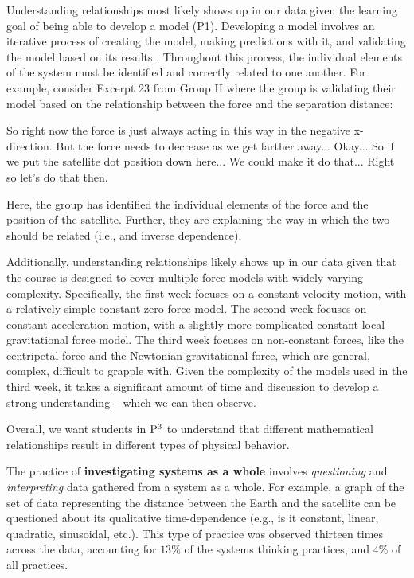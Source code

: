 \documentclass{msuphddissertation}
\begin{document}
\begin{doublespace}
Understanding relationships most likely shows up in our data given the learning goal of being able to develop a model (P1).  Developing a model involves an iterative process of creating the model, making predictions with it, and validating the model based on its results \cite{AAPT2016}.  Throughout this process, the individual elements of the system must be identified and correctly related to one another.  For example, consider Excerpt 23 from Group H where the group is validating their model based on the relationship between the force and the separation distance: \begin{description}
\SC So right now the force is just always acting in this way {in the negative x-direction}.
\SC But the force needs to decrease as we get farther away...
\SB Okay...
\SC So if we put the satellite dot position down here...
\SC We could make it do that...
\SA Right so let's do that then.
\end{description}  Here, the group has identified the individual elements of the force and the position of the satellite.  Further, they are explaining the way in which the two should be related (i.e., and inverse dependence).

Additionally, understanding relationships likely shows up in our data given that the course is designed to cover multiple force models with widely varying complexity.  Specifically, the first week focuses on a constant velocity motion, with a relatively simple constant zero force model.  The second week focuses on constant acceleration motion, with a slightly more complicated constant local gravitational force model.  The third week focuses on non-constant forces, like the centripetal force and the Newtonian gravitational force, which are general, complex, difficult to grapple with.  Given the complexity of the models used in the third week, it takes a significant amount of time and discussion to develop a strong understanding -- which we can then observe.

Overall, we want students in ${\rm P}^{3}$ to understand that different mathematical relationships result in different types of physical behavior.

The practice of \textbf{investigating systems as a whole} involves \textit{questioning} and \textit{interpreting} data gathered from a system as a whole.  For example, a graph of the set of data representing the distance between the Earth and the satellite can be questioned about its qualitative time-dependence (e.g., is it constant, linear, quadratic, sinusoidal, etc.).  This type of practice was observed thirteen times across the data, accounting for $13\%$ of the systems thinking practices, and $4\%$ of all practices.


\end{doublespace}
\end{document}
